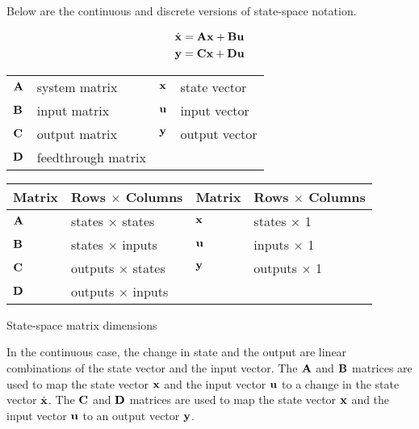 Below are the continuous and discrete versions of state-space notation.
\begin{definition}%
  \begin{align}
    \dot{\mathbf{x}} &= \mathbf{A}\mathbf{x} + \mathbf{B}\mathbf{u} \label{eq:ss_ctrl_x} \\
    \mathbf{y} &= \mathbf{C}\mathbf{x} + \mathbf{D}\mathbf{u} \label{eq:ss_ctrl_y}
  \end{align}
  \begin{figurekey}
    \begin{tabular}{llll}
      $\mathbf{A}$ & system matrix      & $\mathbf{x}$ & state vector \\
      $\mathbf{B}$ & input matrix       & $\mathbf{u}$ & input vector \\
      $\mathbf{C}$ & output matrix      & $\mathbf{y}$ & output vector \\
      $\mathbf{D}$ & feedthrough matrix &  &  \\
    \end{tabular}
  \end{figurekey}
\end{definition}
\begin{booktable}
  \begin{tabular}{|ll|ll|}
    \hline
    \rowcolor{headingbg}
    \textbf{Matrix} & \textbf{Rows $\times$ Columns} &
    \textbf{Matrix} & \textbf{Rows $\times$ Columns} \\
    \hline
    $\mathbf{A}$ & states $\times$ states & $\mathbf{x}$ & states $\times$ 1 \\
    $\mathbf{B}$ & states $\times$ inputs & $\mathbf{u}$ & inputs $\times$ 1 \\
    $\mathbf{C}$ & outputs $\times$ states & $\mathbf{y}$ & outputs $\times$ 1 \\
    $\mathbf{D}$ & outputs $\times$ inputs &  &  \\
    \hline
  \end{tabular}
  \caption{State-space matrix dimensions}
\end{booktable}

In the continuous case, the change in \gls{state} and the \gls{output} are
linear combinations of the \gls{state} vector and the \gls{input} vector. The
$\mathbf{A}$ and $\mathbf{B}$ matrices are used to map the \gls{state} vector
$\mathbf{x}$ and the \gls{input} vector $\mathbf{u}$ to a change in the \gls{state}
vector $\dot{\mathbf{x}}$. The $\mathbf{C}$ and $\mathbf{D}$ matrices are used to map the
\gls{state} vector $\mathbf{x}$ and the \gls{input} vector $\mathbf{u}$ to an
\gls{output} vector $\mathbf{y}$.
